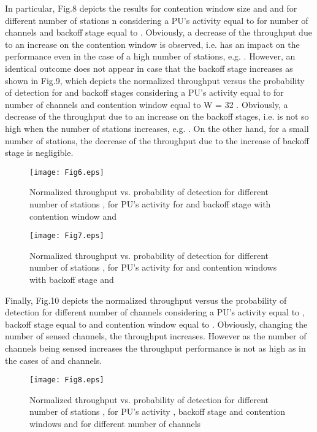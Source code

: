 \documentclass
[journal,11pt,draftclsnofoot,onecolumn,doublespace]{tETN2e}
\begin{document}
In particular, Fig.8 depicts the results for contention window size  and  and for different number of stations n considering a PU’s activity equal to  for  number of channels and backoff stage equal to . Obviously, a decrease of the throughput due to an increase on the contention window is observed, i.e.  has an impact on the performance even in the case of a high number of stations, e.g. . However, an identical outcome does not appear in case that the backoff stage increases as shown in Fig.9, which depicts the normalized throughput  versus the probability of detection  for  and  backoff stages considering a PU’s activity equal to  for  number of channels and contention window equal to W = 32 . Obviously, a decrease of the throughput due to an increase on the backoff stages, i.e.  is not so high when the number of stations increases, e.g. . On the other hand, for a small number of stations, the decrease of the throughput due to the increase of backoff stage is negligible. 
\begin{figure}
\centering
  \texttt{[image: Fig6.eps]}\\
  \caption{Normalized throughput  vs. probability of detection  for different number of stations , for PU’s activity  for  and backoff stage  with contention window  and }
  \label{fig:6}
\end{figure}
\begin{figure}
\centering
  \texttt{[image: Fig7.eps]}\\
  \caption{Normalized throughput  vs. probability of detection  for different number of stations , for PU’s activity  for  and contention windows  with backoff stage  and }
  \label{fig:7}
\end{figure}

Finally, Fig.10 depicts the normalized throughput  versus the probability of detection  for different number of channels  considering a PU’s activity equal to , backoff stage equal to  and contention window equal to . Obviously, changing the number of sensed channels, the throughput increases. However as the number of channels being sensed increases the throughput performance is not as high as in the cases of  and  channels.
\begin{figure}
\centering
  \texttt{[image: Fig8.eps]}\\
  \caption{Normalized throughput  vs. probability of detection  for different number of stations , for PU’s activity , backoff stage  and contention windows  and for different number of channels }
  \label{fig:8}
\end{figure}
\end{document}
